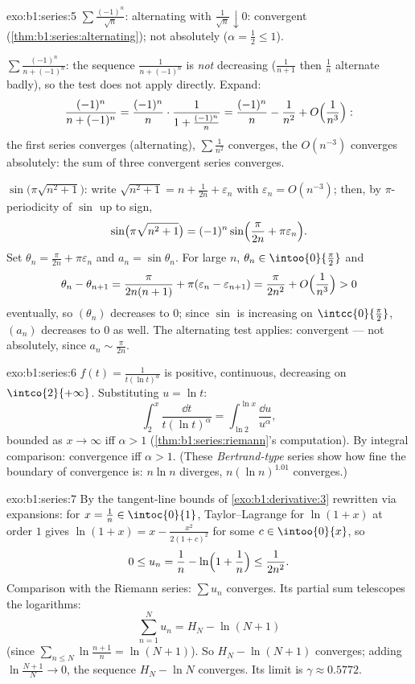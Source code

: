 \begin{solution}{exo:b1:series:5}
$\sum \frac{(-1)^n}{\sqrt n}$: alternating with $\frac{1}{\sqrt n}
\downarrow 0$: convergent (\cref{thm:b1:series:alternating}); not
absolutely ($\alpha = \frac12 \leq 1$).

$\sum \frac{(-1)^n}{n + (-1)^n}$: the sequence $\frac{1}{n +
(-1)^n}$ is \emph{not} decreasing ($\frac{1}{n+1}$ then
$\frac{1}{n}$ alternate badly), so the test does not apply directly.
Expand:
\[
\frac{(-1)^n}{n + (-1)^n}
= \frac{(-1)^n}{n}\cdot\frac{1}{1 + \frac{(-1)^n}{n}}
= \frac{(-1)^n}{n} - \frac{1}{n^2} +
O\Bigl(\frac{1}{n^3}\Bigr):
\]
the first series converges (alternating), $\sum \frac{1}{n^2}$
converges, the $O(n^{-3})$ converges absolutely: the sum of three
convergent series converges.

$\sin\bigl(\pi\sqrt{n^2+1}\bigr)$: write $\sqrt{n^2 + 1} = n +
\frac{1}{2n} + \varepsilon_n$ with $\varepsilon_n = O(n^{-3})$;
then, by $\pi$-periodicity of $\sin$ up to sign,
\[
\sin\bigl(\pi\sqrt{n^2+1}\bigr)
= (-1)^n \sin\Bigl(\frac{\pi}{2n} + \pi\varepsilon_n\Bigr) .
\]
Set $\theta_n = \frac{\pi}{2n} + \pi\varepsilon_n$ and $a_n =
\sin\theta_n$. For large $n$, $\theta_n \in \intoo{0}{\frac\pi2}$
and
\[
\theta_n - \theta_{n+1} = \frac{\pi}{2n(n+1)} +
\pi(\varepsilon_n - \varepsilon_{n+1})
= \frac{\pi}{2n^2} + O\Bigl(\frac{1}{n^3}\Bigr) > 0
\]
eventually, so $(\theta_n)$ decreases to $0$; since $\sin$ is
increasing on $\intcc{0}{\frac\pi2}$, $(a_n)$ decreases to $0$ as
well. The alternating test applies: convergent --- not absolutely,
since $a_n \sim \frac{\pi}{2n}$.
\end{solution}

\begin{solution}{exo:b1:series:6}
$f(t) = \frac{1}{t(\ln t)^\alpha}$ is positive, continuous,
decreasing on $\intco{2}{+\infty}$. Substituting $u = \ln t$:
\[
\int_2^x \frac{\dd t}{t(\ln t)^\alpha}
= \int_{\ln 2}^{\ln x} \frac{\dd u}{u^\alpha},
\]
bounded as $x \to \infty$ iff $\alpha > 1$
(\cref{thm:b1:series:riemann}'s computation). By integral
comparison: convergence iff $\alpha > 1$. (These \emph{Bertrand-type}
series show how fine the boundary of convergence is: $n\ln n$
diverges, $n(\ln n)^{1.01}$ converges.)
\end{solution}

\begin{solution}{exo:b1:series:7}
By the tangent-line bounds of \cref{exo:b1:derivative:3} rewritten
via expansions: for $x = \frac1n \in \intoc{0}{1}$, Taylor--Lagrange
for $\ln(1+x)$ at order $1$ gives $\ln(1 + x) = x - \frac{x^2}{2(1 +
c)^2}$ for some $c \in \intoo{0}{x}$, so
\[
0 \leq u_n = \frac1n - \ln\Bigl(1 + \frac1n\Bigr) \leq
\frac{1}{2n^2} .
\]
Comparison with the Riemann series: $\sum u_n$ converges. Its partial
sum telescopes the logarithms:
\[
\sum_{n=1}^{N} u_n = H_N - \ln(N+1)
\]
(since $\sum_{n\leq N} \ln\frac{n+1}{n} = \ln(N+1)$). So $H_N -
\ln(N+1)$ converges; adding $\ln\frac{N+1}{N} \to 0$, the sequence
$H_N - \ln N$ converges. Its limit is $\gamma \approx 0.5772$.
\end{solution}

